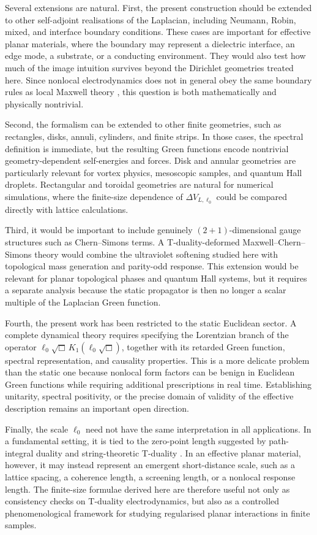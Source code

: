 \documentclass[nopacs,amsmath,amsfonts,amssymb,aps,superscriptaddress]{revtex4}
\begin{document}
Several extensions are natural. First, the present construction should be extended to other self-adjoint realisations of the Laplacian, including Neumann, Robin, mixed, and interface boundary conditions. These cases are important for effective planar materials, where the boundary may represent a dielectric interface, an edge mode, a substrate, or a conducting environment. They would also test how much of the image intuition survives beyond the Dirichlet geometries treated here. Since nonlocal electrodynamics does not in general obey the same boundary rules as local Maxwell theory \cite{BorgesBufalo2025}, this question is both mathematically and physically nontrivial.

Second, the formalism can be extended to other finite geometries, such as rectangles, disks, annuli, cylinders, and finite strips. In those cases, the spectral definition is immediate, but the resulting Green functions encode nontrivial geometry-dependent self-energies and forces. Disk and annular geometries are particularly relevant for vortex physics, mesoscopic samples, and quantum Hall droplets. Rectangular and toroidal geometries are natural for numerical simulations, where the finite-size dependence of $\Delta V_{L,\ell_0}$ could be compared directly with lattice calculations.

Third, it would be important to include genuinely $(2+1)$-dimensional gauge structures such as Chern--Simons terms. A T-duality-deformed Maxwell--Chern--Simons theory would combine the ultraviolet softening studied here with topological mass generation and parity-odd response. This extension would be relevant for planar topological phases and quantum Hall systems, but it requires a separate analysis because the static propagator is then no longer a scalar multiple of the Laplacian Green function.

Fourth, the present work has been restricted to the static Euclidean sector. A complete dynamical theory requires specifying the Lorentzian branch of the operator $\ell_0\sqrt{\Box}\, K_1(\ell_0\sqrt{\Box})$, together with its retarded Green function, spectral representation, and causality properties. This is a more delicate problem than the static one because nonlocal form factors can be benign in Euclidean Green functions while requiring additional prescriptions in real time. Establishing unitarity, spectral positivity, or the precise domain of validity of the effective description remains an important open direction.

Finally, the scale $\ell_0$ need not have the same interpretation in all applications. In a fundamental setting, it is tied to the zero-point length suggested by path-integral duality and string-theoretic T-duality \cite{Padmanabhan1997, SmailagicSpallucciPadmanabhan2003, FontaniniSpallucciPadmanabhan2006}. In an effective planar material, however, it may instead represent an emergent short-distance scale, such as a lattice spacing, a coherence length, a screening length, or a nonlocal response length. The finite-size formulae derived here are therefore useful not only as consistency checks on T-duality electrodynamics, but also as a controlled phenomenological framework for studying regularised planar interactions in finite samples.
\end{document}
